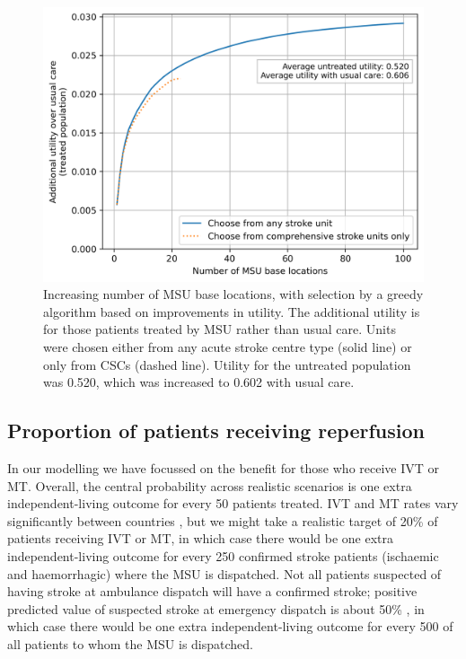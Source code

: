 \begin{figure}[h]
    \centering
    \includegraphics[width=0.5\linewidth]{images/msu_advantages_greedy.png}
    \caption{Increasing number of MSU base locations, with selection by a greedy algorithm based on improvements in utility. The additional utility is for those patients treated by MSU rather than usual care. Units were chosen either from any acute stroke centre type (solid line) or only from CSCs (dashed line). Utility for the untreated population was 0.520, which was increased to 0.602 with usual care.}
    \label{fig:greedy}
\end{figure}

\subsection{Proportion of patients receiving reperfusion}

In our modelling we have focussed on the benefit for those who receive IVT or MT. Overall, the central probability across realistic scenarios is one extra independent-living outcome for every 50 patients treated. IVT and MT rates vary significantly between countries \cite{kim_global_2024}, but we might take a realistic target of 20\% of patients receiving IVT or MT, in which case there would be one extra independent-living outcome for every 250 confirmed stroke patients (ischaemic and haemorrhagic) where the MSU is dispatched. Not all patients suspected of having stroke at ambulance dispatch will have a confirmed stroke; positive predicted value of suspected stroke at emergency dispatch is about 50\% \cite{kim_global_2024}, in which case there would be one extra independent-living outcome for every 500 of all patients to whom the MSU is dispatched.
